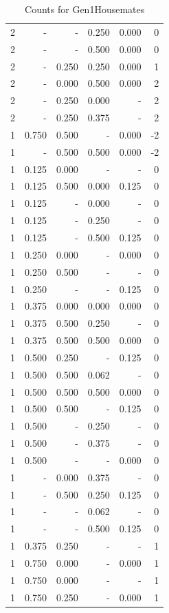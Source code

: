 \documentclass[a4paper]{article}\usepackage[]{graphicx}\usepackage[]{color}
\begin{document}
\begin{table}[ht]
\begin{tabular}{rrrrrr}
   \rowcolor{sosoColor} 2 & - & - & 0.250 & 0.000 & 0 \\ 
   \rowcolor{sosoColor} 2 & - & - & 0.500 & 0.000 & 0 \\ 
   \rowcolor{goodColor} 2 & - & 0.250 & 0.250 & 0.000 & 1 \\ 
   \rowcolor{badColor} 2 & - & 0.000 & 0.500 & 0.000 & 2 \\ 
   \rowcolor{badColor} 2 & - & 0.250 & 0.000 & - & 2 \\ 
  2 & - & 0.250 & 0.375 & - & 2 \\ 
  1 & 0.750 & 0.500 & - & 0.000 & -2 \\ 
   \rowcolor{goodColor} 1 & - & 0.500 & 0.500 & 0.000 & -2 \\ 
  1 & 0.125 & 0.000 & - & - & 0 \\ 
   \rowcolor{badColor} 1 & 0.125 & 0.500 & 0.000 & 0.125 & 0 \\ 
   \rowcolor{sosoColor} 1 & 0.125 & - & 0.000 & - & 0 \\ 
   \rowcolor{sosoColor} 1 & 0.125 & - & 0.250 & - & 0 \\ 
   \rowcolor{sosoColor} 1 & 0.125 & - & 0.500 & 0.125 & 0 \\ 
  1 & 0.250 & 0.000 & - & 0.000 & 0 \\ 
  1 & 0.250 & 0.500 & - & - & 0 \\ 
   \rowcolor{nullColor} 1 & 0.250 & - & - & 0.125 & 0 \\ 
   \rowcolor{goodColor} 1 & 0.375 & 0.000 & 0.000 & 0.000 & 0 \\ 
   \rowcolor{badColor} 1 & 0.375 & 0.500 & 0.250 & - & 0 \\ 
   \rowcolor{goodColor} 1 & 0.375 & 0.500 & 0.500 & 0.000 & 0 \\ 
  1 & 0.500 & 0.250 & - & 0.125 & 0 \\ 
   \rowcolor{badColor} 1 & 0.500 & 0.500 & 0.062 & - & 0 \\ 
   \rowcolor{goodColor} 1 & 0.500 & 0.500 & 0.500 & 0.000 & 0 \\ 
  1 & 0.500 & 0.500 & - & 0.125 & 0 \\ 
   \rowcolor{sosoColor} 1 & 0.500 & - & 0.250 & - & 0 \\ 
   \rowcolor{sosoColor} 1 & 0.500 & - & 0.375 & - & 0 \\ 
   \rowcolor{nullColor} 1 & 0.500 & - & - & 0.000 & 0 \\ 
   \rowcolor{badColor} 1 & - & 0.000 & 0.375 & - & 0 \\ 
   \rowcolor{badColor} 1 & - & 0.500 & 0.250 & 0.125 & 0 \\ 
   \rowcolor{sosoColor} 1 & - & - & 0.062 & - & 0 \\ 
   \rowcolor{sosoColor} 1 & - & - & 0.500 & 0.125 & 0 \\ 
  1 & 0.375 & 0.250 & - & - & 1 \\ 
  1 & 0.750 & 0.000 & - & 0.000 & 1 \\ 
  1 & 0.750 & 0.000 & - & - & 1 \\ 
  1 & 0.750 & 0.250 & - & 0.000 & 1 \\ 
   \hline
\end{tabular}
\caption{Counts for Gen1Housemates} 
\end{table}
\end{document}
